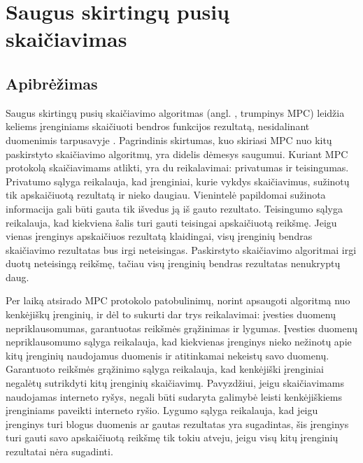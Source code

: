 \documentclass{VUMIFInfBakalaurinis}
\begin{document}
\section{Saugus skirtingų pusių skaičiavimas}
\subsection{Apibrėžimas}
\par Saugus skirtingų pusių skaičiavimo algoritmas (angl. , trumpinys MPC) leidžia keliems įrenginiams skaičiuoti bendros funkcijos rezultatą, nesidalinant duomenimis tarpusavyje \cite{22}. Pagrindinis skirtumas, kuo  skiriasi MPC nuo kitų paskirstyto skaičiavimo algoritmų, yra didelis dėmesys saugumui. Kuriant MPC protokolą skaičiavimams atlikti, yra du reikalavimai: privatumas ir teisingumas. Privatumo sąlyga reikalauja, kad įrenginiai, kurie vykdys skaičiavimus, sužinotų tik apskaičiuotą rezultatą ir nieko daugiau. Vienintelė papildomai sužinota informacija gali būti gauta tik išvedus ją iš gauto rezultato. Teisingumo sąlyga reikalauja, kad kiekviena šalis turi gauti teisingai apskaičiuotą reikšmę. Jeigu vienas įrenginys apskaičiuos rezultatą klaidingai, visų įrenginių bendras skaičiavimo rezultatas bus irgi neteisingas. Paskirstyto skaičiavimo algoritmai irgi duotų neteisingą reikšmę, tačiau visų įrenginių bendras rezultatas nenukryptų daug.
\par Per laiką atsirado MPC protokolo patobulinimų, norint apsaugoti algoritmą nuo kenkėjiškų įrenginių, ir dėl to sukurti dar trys reikalavimai: įvesties duomenų nepriklausomumas, garantuotas reikšmės grąžinimas ir lygumas. Įvesties duomenų nepriklausomumo sąlyga reikalauja, kad kiekvienas įrenginys nieko nežinotų apie kitų įrenginių naudojamus duomenis ir atitinkamai nekeistų savo duomenų. Garantuoto reikšmės grąžinimo sąlyga reikalauja, kad kenkėjiški įrenginiai negalėtų sutrikdyti kitų įrenginių skaičiavimų. Pavyzdžiui, jeigu skaičiavimams naudojamas interneto ryšys, negali būti sudaryta galimybė leisti kenkėjiškiems įrenginiams paveikti interneto ryšio. Lygumo sąlyga reikalauja, kad jeigu įrenginys turi blogus duomenis ar gautas rezultatas yra sugadintas, šis įrenginys turi gauti savo apskaičiuotą reikšmę tik tokiu atveju, jeigu visų kitų įrenginių rezultatai nėra sugadinti.
\end{document}
